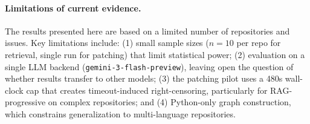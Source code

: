 \paragraph{Limitations of current evidence.}
The results presented here are based on a limited number of repositories and issues. Key limitations include: (1) small sample sizes ($n=10$ per repo for retrieval, single run for patching) that limit statistical power; (2) evaluation on a single LLM backend (\texttt{gemini-3-flash-preview}), leaving open the question of whether results transfer to other models; (3) the patching pilot uses a 480s wall-clock cap that creates timeout-induced right-censoring, particularly for RAG-progressive on complex repositories; and (4) Python-only graph construction, which constrains generalization to multi-language repositories.
